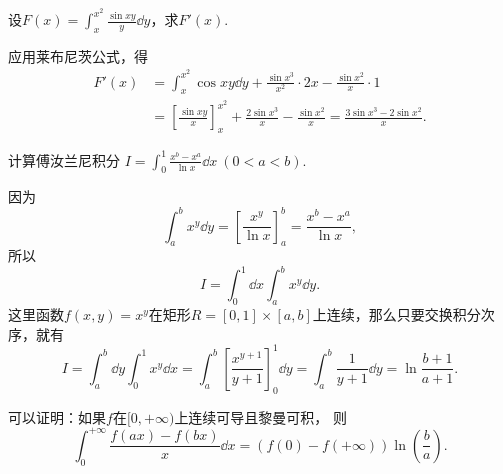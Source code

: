 \begin{example}
设\(F(x) = \int_x^{x^2} \frac{\sin xy}{y} \dd{y}\)，求\(F'(x)\).
\begin{solution}
应用莱布尼茨公式，得\begin{align*}
	F'(x) &= \int_x^{x^2} \cos xy \dd{y}
	+ \frac{\sin x^3}{x^2} \cdot 2x
	- \frac{\sin x^2}{x} \cdot 1 \\
	&= \left[ \frac{\sin xy}{x} \right]_x^{x^2}
	+ \frac{2 \sin x^3}{x}
	- \frac{\sin x^2}{x}
	= \frac{3 \sin x^3 - 2 \sin x^2}{x}.
\end{align*}
\end{solution}
\end{example}

\begin{example}
计算傅汝兰尼积分
\(I = \int_0^1 \frac{x^b-x^a}{\ln x} \dd{x}\ (0<a<b)\).
\begin{solution}
因为\[
	\int_a^b x^y \dd{y}
	= \left[ \frac{x^y}{\ln x} \right]_a^b
	= \frac{x^b - x^a}{\ln x},
\]
所以\[
	I = \int_0^1 \dd{x} \int_a^b x^y \dd{y}.
\]
这里函数\(f(x,y) = x^y\)在矩形\(R=[0,1]\times[a,b]\)上连续，那么只要交换积分次序，就有\[
	I = \int_a^b \dd{y} \int_0^1 x^y \dd{x}
	= \int_a^b \left[\frac{x^{y+1}}{y+1}\right]_0^1 \dd{y}
	= \int_a^b \frac{1}{y+1} \dd{y}
	= \ln\frac{b+1}{a+1}.
\]
\end{solution}
\end{example}
\begin{remark}
可以证明：如果\(f\)在\([0,+\infty)\)上连续可导且黎曼可积，
则\begin{equation}
	\int_0^{+\infty} \frac{f(ax)-f(bx)}{x} \dd{x} = (f(0)-f(+\infty)) \ln(\frac{b}{a}).
\end{equation}
\end{remark}

